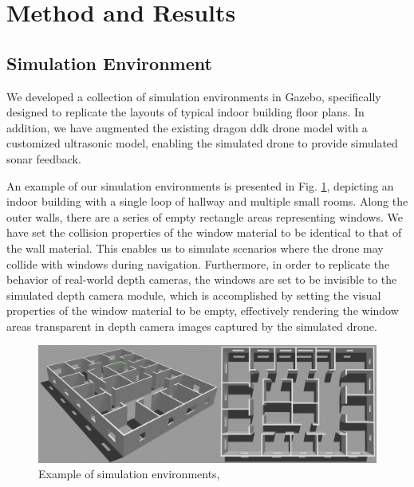 \section{Method and Results}
\label{sec:method}

\subsection{Simulation Environment}
\label{sec:method_sim}

We developed a collection of simulation environments in Gazebo, specifically designed to replicate the layouts of typical indoor building floor plans. In addition, we have augmented the existing dragon ddk drone model with a customized ultrasonic model, enabling the simulated drone to provide simulated sonar feedback.

An example of our simulation environments is presented in Fig. \ref{fig:sim_env}, depicting an indoor building with a single loop of hallway and multiple small rooms. Along the outer walls, there are a series of empty rectangle areas representing windows. We have set the collision properties of the window material to be identical to that of the wall material. This enables us to simulate scenarios where the drone may collide with windows during navigation. Furthermore, in order to replicate the behavior of real-world depth cameras, the windows are set to be invisible to the simulated depth camera module, which is accomplished by setting the visual properties of the window material to be empty, effectively rendering the window areas transparent in depth camera images captured by the simulated drone. 

\begin{figure}[h]
    \centering
    \includegraphics[width=1.0\columnwidth]{fig/sim_env.png}
    \caption{Example of simulation environments,}
    \label{fig:sim_env}
\end{figure}

